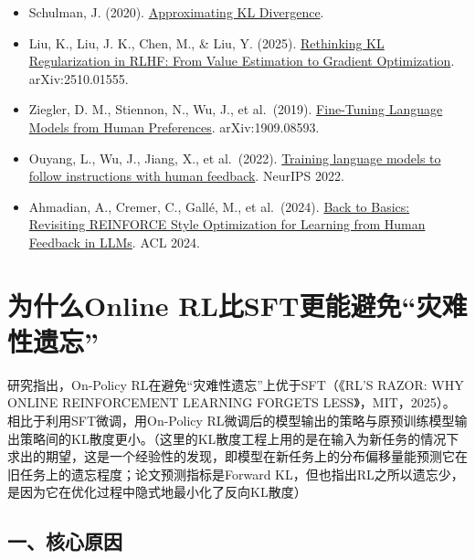 \vspace{0.25em}
\begin{itemize}
\tightlist
\item
  Schulman, J. (2020). \href{http://joschu.net/blog/kl-approx.html}{Approximating KL Divergence}.
\item
  Liu, K., Liu, J. K., Chen, M., \& Liu, Y. (2025). \href{https://arxiv.org/abs/2510.01555}{Rethinking KL Regularization in RLHF: From Value Estimation to Gradient Optimization}. arXiv:2510.01555.
\item
  Ziegler, D. M., Stiennon, N., Wu, J., et al.~(2019). \href{https://arxiv.org/abs/1909.08593}{Fine-Tuning Language Models from Human Preferences}. arXiv:1909.08593.
\item
  Ouyang, L., Wu, J., Jiang, X., et al.~(2022). \href{https://arxiv.org/abs/2203.02155}{Training language models to follow instructions with human feedback}. NeurIPS 2022.
\item
  Ahmadian, A., Cremer, C., Gallé, M., et al.~(2024). \href{https://arxiv.org/abs/2402.14740}{Back to Basics: Revisiting REINFORCE Style Optimization for Learning from Human Feedback in LLMs}. ACL 2024.
\end{itemize}

\clearpage

\hypertarget{ux4e3aux4ec0ux4e48online-rlux6bd4sftux66f4ux80fdux907fux514dux707eux96beux6027ux9057ux5fd8}{%
\section{为什么Online RL比SFT更能避免``灾难性遗忘''}\label{ux4e3aux4ec0ux4e48online-rlux6bd4sftux66f4ux80fdux907fux514dux707eux96beux6027ux9057ux5fd8}}

研究指出，On-Policy RL在避免``灾难性遗忘''上优于SFT（《RL'S RAZOR: WHY ONLINE REINFORCEMENT LEARNING FORGETS LESS》，MIT，2025）。相比于利用SFT微调，用On-Policy RL微调后的模型输出的策略与原预训练模型输出策略间的KL散度更小。（这里的KL散度工程上用的是在输入为新任务的情况下求出的期望，这是一个经验性的发现，即模型在新任务上的分布偏移量能预测它在旧任务上的遗忘程度；论文预测指标是Forward KL，但也指出RL之所以遗忘少，是因为它在优化过程中隐式地最小化了反向KL散度）

\hypertarget{ux4e00ux6838ux5fc3ux539fux56e0}{%
\subsection{一、核心原因}\label{ux4e00ux6838ux5fc3ux539fux56e0}}


